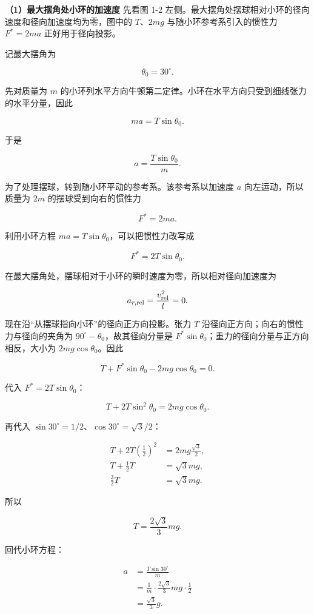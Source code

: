 \documentclass[12pt,a4paper,UTF8]{ctexart}
\begin{document}
\textbf{（1）最大摆角处小环的加速度} 先看图 1-2
左侧。最大摆角处摆球相对小环的径向速度和径向加速度均为零，图中的
\(T\)、\(2mg\) 与随小环参考系引入的惯性力 \(F^*=2ma\) 正好用于径向投影。

记最大摆角为

\[\theta_0=30^\circ.\]

先对质量为 \(m\)
的小环列水平方向牛顿第二定律。小环在水平方向只受到细线张力的水平分量，因此

\[ma=T\sin\theta_0.\]

于是

\[
\boxed{a=\frac{T\sin\theta_0}{m}}.
\]

为了处理摆球，转到随小环平动的参考系。该参考系以加速度 \(a\)
向左运动，所以质量为 \(2m\) 的摆球受到向右的惯性力

\[
F^*=2ma.
\]

利用小环方程 \(ma=T\sin\theta_0\)，可以把惯性力改写成

\[
F^*=2T\sin\theta_0.
\]

在最大摆角处，摆球相对于小环的瞬时速度为零，所以相对径向加速度为

\[
a_{r,\rm rel}=\frac{v_{\rm rel}^2}{l}=0.
\]

现在沿``从摆球指向小环''的径向正方向投影。张力 \(T\)
沿径向正方向；向右的惯性力与径向的夹角为
\(90^\circ-\theta_0\)，故其径向分量是
\(F^*\sin\theta_0\)；重力的径向分量与正方向相反，大小为
\(2mg\cos\theta_0\)。因此

\[
T+F^*\sin\theta_0-2mg\cos\theta_0=0.
\]

代入 \(F^*=2T\sin\theta_0\)：

\[
T+2T\sin^2\theta_0=2mg\cos\theta_0.
\]

再代入 \(\sin30^\circ=1/2\)、\(\cos30^\circ=\sqrt3/2\)：

\[
\begin{aligned}
T+2T\left(\frac12\right)^2
&=2mg\frac{\sqrt3}{2},\\
T+\frac12T
&=\sqrt3mg,\\
\frac32T
&=\sqrt3mg.
\end{aligned}
\]

所以

\[
\boxed{T=\frac{2\sqrt3}{3}mg}.
\]

回代小环方程：

\[
\begin{aligned}
a
&=\frac{T\sin30^\circ}{m}\\
&=\frac{1}{m}\cdot\frac{2\sqrt3}{3}mg\cdot\frac12\\
&=\frac{\sqrt3}{3}g.
\end{aligned}
\]
\end{document}
